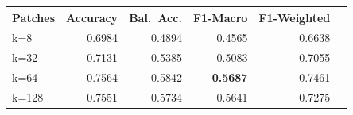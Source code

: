 \begin{tabular}{lrrrrr}
\toprule
Patches & Accuracy & Bal.\ Acc. & F1-Macro & F1-Weighted \\
\midrule
k=8 & 0.6984 & 0.4894 & 0.4565 & 0.6638 \\
k=32 & 0.7131 & 0.5385 & 0.5083 & 0.7055 \\
k=64 & 0.7564 & 0.5842 & \textbf{0.5687} & 0.7461 \\
k=128 & 0.7551 & 0.5734 & 0.5641 & 0.7275 \\
\bottomrule
\end{tabular}